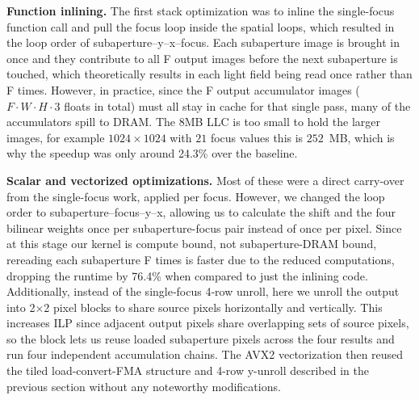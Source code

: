\documentclass[letterpaper]{article}
\newcommand{\mypar}[1]{{\bf #1.}}
\begin{document}
\mypar{Function inlining}
The first stack optimization was to inline the single-focus function call and pull the focus loop inside the spatial loops, which resulted in the loop order of subaperture--y--x--focus. Each subaperture image is brought in once and they contribute to all F output images before the next subaperture is touched, which theoretically results in each light field being read once rather than F times. However, in practice, since the F output accumulator images ($F \cdot W \cdot H \cdot 3$ floats in total) must all stay in cache for that single pass, many of the accumulators spill to DRAM. The 8MB LLC is too small to hold the larger images, for example $1024 \times 1024$ with $21$ focus values this is $252$~MB, which is why the speedup was only around 24.3\% over the baseline. 

\mypar{Scalar and vectorized optimizations} Most of these were a direct carry-over from the single-focus work, applied per focus. However, we changed the loop order to subaperture--focus--y--x, allowing us to calculate the shift and the four bilinear weights once per subaperture-focus pair instead of once per pixel. Since at this stage our kernel is compute bound, not subaperture-DRAM bound, rereading each subaperture F times is faster due to the reduced computations, dropping the runtime by 76.4\% when compared to just the inlining code. Additionally, instead of the single‑focus 4‑row unroll, here we unroll the output into 2×2 pixel blocks to share source pixels horizontally and vertically. This increases ILP since adjacent output pixels share overlapping sets of source pixels, so the block lets us reuse loaded subaperture pixels across the four results and run four independent accumulation chains. The AVX2 vectorization then reused the tiled load-convert-FMA structure and 4-row y-unroll described in the previous section without any noteworthy modifications.
\end{document}
